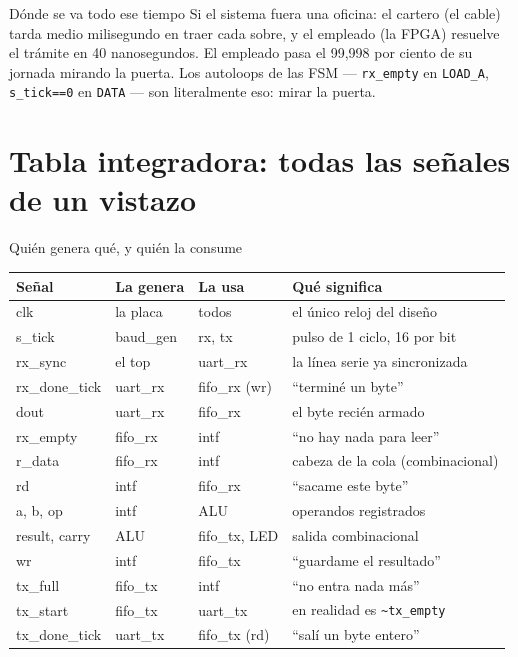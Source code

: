 \documentclass[11pt,a4paper]{article}
\newcommand{\sg}[1]{\texttt{\small #1}}
\begin{document}
\begin{intuicion}{D\'onde se va todo ese tiempo}
Si el sistema fuera una oficina: el cartero (el cable) tarda medio milisegundo
en traer cada sobre, y el empleado (la FPGA) resuelve el tr\'amite en 40
nanosegundos. El empleado pasa el 99,998 por ciento de su jornada mirando la
puerta. Los autoloops de las FSM --- \sg{rx\_empty} en \sg{LOAD\_A},
\sg{s\_tick==0} en \sg{DATA} --- son literalmente eso: mirar la puerta.
\end{intuicion}

\section{Tabla integradora: todas las se\~nales de un vistazo}

\begin{ficha}{Qui\'en genera qu\'e, y qui\'en la consume}
\renewcommand{\arraystretch}{1.2}
\begin{tabular}{@{}>{\ttfamily\small}l >{\sffamily\small}l >{\sffamily\small}l p{5.8cm}@{}}
\toprule
\textnormal{\textbf{\sffamily Se\~nal}} & \textbf{La genera} & \textbf{La usa} & \textbf{\sffamily Qu\'e significa} \\
\midrule
clk          & la placa    & todos         & el \'unico reloj del dise\~no \\
s\_tick      & baud\_gen   & rx, tx        & pulso de 1 ciclo, 16 por bit \\
rx\_sync     & el top      & uart\_rx      & la l\'inea serie ya sincronizada \\
rx\_done\_tick& uart\_rx   & fifo\_rx (wr) & ``termin\'e un byte'' \\
dout         & uart\_rx    & fifo\_rx      & el byte reci\'en armado \\
rx\_empty    & fifo\_rx    & intf          & ``no hay nada para leer'' \\
r\_data      & fifo\_rx    & intf          & cabeza de la cola (combinacional) \\
rd           & intf        & fifo\_rx      & ``sacame este byte'' \\
a, b, op     & intf        & ALU           & operandos registrados \\
result, carry& ALU         & fifo\_tx, LED & salida combinacional \\
wr           & intf        & fifo\_tx      & ``guardame el resultado'' \\
tx\_full     & fifo\_tx    & intf          & ``no entra nada m\'as'' \\
tx\_start    & fifo\_tx    & uart\_tx      & en realidad es \texttt{\textasciitilde tx\_empty} \\
tx\_done\_tick& uart\_tx   & fifo\_tx (rd) & ``sal\'i un byte entero'' \\
\bottomrule
\end{tabular}
\end{ficha}
\end{document}
